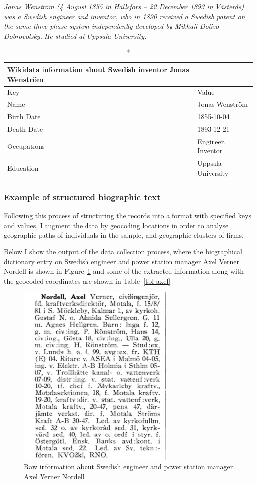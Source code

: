 \documentclass[
]{article}
\begin{document}
\emph{Jonas Wenström (4 August 1855 in Hällefors -- 22 December 1893 in
Västerås) was a Swedish engineer and inventor, who in 1890 received a
Swedish patent on the same three-phase system independently developed by
Mikhail Dolivo-Dobrovolsky. He studied at Uppsala University.}

\begin{longtable*}{ll}
\caption*{
{\large Wikidata information about Swedish inventor \textbf{Jonas Wenström}}
} \\ 
\toprule
Key & Value \\ 
\midrule\addlinespace[2.5pt]
Name & Jonas Wenström \\ 
Birth Date & 1855-10-04 \\ 
Death Date & 1893-12-21 \\ 
Occupations & Engineer, Inventor \\ 
Education & Uppsala University \\ 
\bottomrule
\end{longtable*}

\hypertarget{example-of-structured-biographic-text}{%
\subsubsection{Example of structured biographic
text}\label{example-of-structured-biographic-text}}

Following this process of structuring the records into a format with
specified keys and values, I augment the data by geocoding locations in
order to analyse geographic paths of individuals in the sample, and
geographic clusters of firms.

Below I show the output of the data collection process, where the
biographical dictionary entry on Swedish engineer and power station
manager Axel Verner Nordell is shown in Figure~\ref{fig-axel} and some
of the extracted information along with the geocoded coordinates are
shown in Table~\ref{tbl-axel}.

\begin{figure}

{\centering \includegraphics[width=3in,height=\textheight]{assets/axel.png}

}

\caption{\label{fig-axel}Raw information about Swedish engineer and
power station manager Axel Verner Nordell}

\end{figure}
\end{document}
